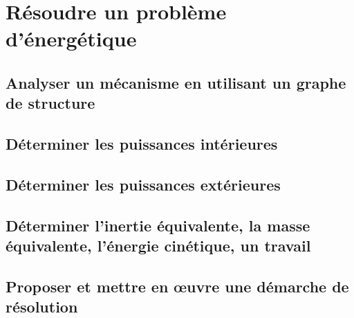 \graphicspath{{\repStyle/png/}{../DYN/DYN-06-PFD/08_RR3D/images/}} 
 
 
\graphicspath{{\repStyle/png/}{../DYN/DYN-06-PFD/09_RT_RSG/images/}} 
 
 
\graphicspath{{\repStyle/png/}{../DYN/DYN-06-PFD/46_RR_RSG/images/}} 
 
 
\graphicspath{{\repStyle/png/}{../DYN/DYN-06-PFD/50_BancBalafre/images/}} 
 
 
\setchapterpreamble[u]{\margintoc} 
\chapter{Résoudre un problème d'énergétique} 
\section{Analyser un mécanisme en utilisant un graphe de structure} 
\section{Déterminer les puissances intérieures} 
\section{Déterminer les puissances extérieures} 
\section{Déterminer l'inertie équivalente, la masse équivalente, l'énergie cinétique, un travail} 
\section{Proposer et mettre en œuvre une démarche de résolution} 
\graphicspath{{\repStyle/png/}{../TEC/TEC-05/10_PompePalette/images/}} 
 
 
\graphicspath{{\repStyle/png/}{../TEC/TEC-05/11_PompePistonsRadiaux/images/}} 
 
 
\graphicspath{{\repStyle/png/}{../TEC/TEC-05/12_BielleManivelle/images/}} 
 
 
\graphicspath{{\repStyle/png/}{../TEC/TEC-05/13_TransfoMouvement/images/}} 
 
 
